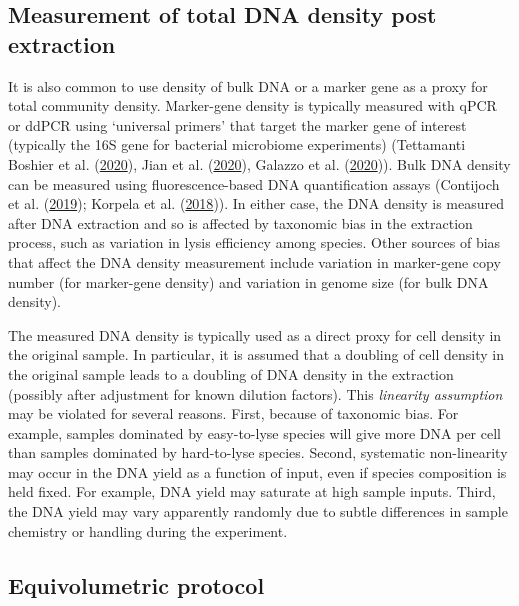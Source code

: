 \documentclass[
]{article}
\begin{document}
\hypertarget{measurement-of-total-dna-density-post-extraction}{%
\subsection{Measurement of total DNA density post extraction}\label{measurement-of-total-dna-density-post-extraction}}

It is also common to use density of bulk DNA or a marker gene as a proxy for total community density.
Marker-gene density is typically measured with qPCR or ddPCR using `universal primers' that target the marker gene of interest (typically the 16S gene for bacterial microbiome experiments) (Tettamanti Boshier et al. (\protect\hyperlink{ref-tettamantiboshier2020comp}{2020}), Jian et al. (\protect\hyperlink{ref-jian2020quan}{2020}), Galazzo et al. (\protect\hyperlink{ref-galazzo2020howt}{2020})).
Bulk DNA density can be measured using fluorescence-based DNA quantification assays (Contijoch et al. (\protect\hyperlink{ref-contijoch2019gutm}{2019}); Korpela et al. (\protect\hyperlink{ref-korpela2018inte}{2018})).
In either case, the DNA density is measured after DNA extraction and so is affected by taxonomic bias in the extraction process, such as variation in lysis efficiency among species.
Other sources of bias that affect the DNA density measurement include variation in marker-gene copy number (for marker-gene density) and variation in genome size (for bulk DNA density).

The measured DNA density is typically used as a direct proxy for cell density in the original sample.
In particular, it is assumed that a doubling of cell density in the original sample leads to a doubling of DNA density in the extraction (possibly after adjustment for known dilution factors).
This \emph{linearity assumption} may be violated for several reasons.
First, because of taxonomic bias.
For example, samples dominated by easy-to-lyse species will give more DNA per cell than samples dominated by hard-to-lyse species.
Second, systematic non-linearity may occur in the DNA yield as a function of input, even if species composition is held fixed.
For example, DNA yield may saturate at high sample inputs.
Third, the DNA yield may vary apparently randomly due to subtle differences in sample chemistry or handling during the experiment.

\hypertarget{equivolumetric-protocol}{%
\subsection{Equivolumetric protocol}\label{equivolumetric-protocol}}
\end{document}
